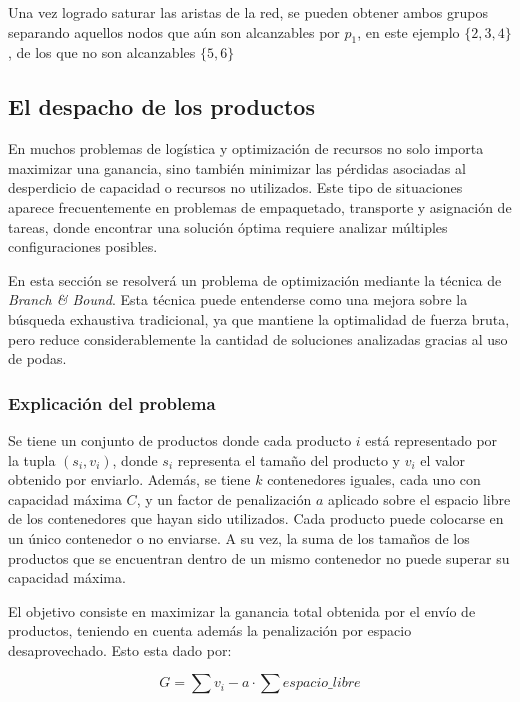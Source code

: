\documentclass[12pt]{article}
\begin{document}
            Una vez logrado saturar las aristas de la red, se pueden obtener ambos grupos separando aquellos nodos que aún son alcanzables por $p_1$, en este ejemplo $\{2, 3, 4\}$, de los que no son alcanzables  $\{5, 6\}$

    \subsection{El despacho de los productos}

        En muchos problemas de logística y optimización de recursos no solo importa maximizar una ganancia, sino también minimizar las pérdidas asociadas al desperdicio de capacidad o recursos no utilizados. Este tipo de situaciones aparece frecuentemente en problemas de empaquetado, transporte y asignación de tareas, donde encontrar una solución óptima requiere analizar múltiples configuraciones posibles.

        En esta sección se resolverá un problema de optimización mediante la técnica de \textit{Branch \& Bound}. Esta técnica puede entenderse como una mejora sobre la búsqueda exhaustiva tradicional, ya que mantiene la optimalidad de fuerza bruta, pero reduce considerablemente la cantidad de soluciones analizadas gracias al uso de podas. 

        \subsubsection{Explicación del problema}

            Se tiene un conjunto de productos donde cada producto \(i\) está representado por la tupla \((s_i, v_i)\), donde \(s_i\) representa el tamaño del producto y \(v_i\) el valor obtenido por enviarlo. Además, se tiene \(k\) contenedores iguales, cada uno con capacidad máxima \(C\), y un factor de penalización \(a\) aplicado sobre el espacio libre de los contenedores que hayan sido utilizados. Cada producto puede colocarse en un único contenedor o no enviarse. A su vez, la suma de los tamaños de los productos que se encuentran dentro de un mismo contenedor no puede superar su capacidad máxima.

            El objetivo consiste en maximizar la ganancia total obtenida por el envío de productos, teniendo en cuenta además la penalización por espacio desaprovechado. Esto esta dado por:

            \[
            G = \sum v_i - a \cdot \sum espacio\_libre
            \]
\end{document}
